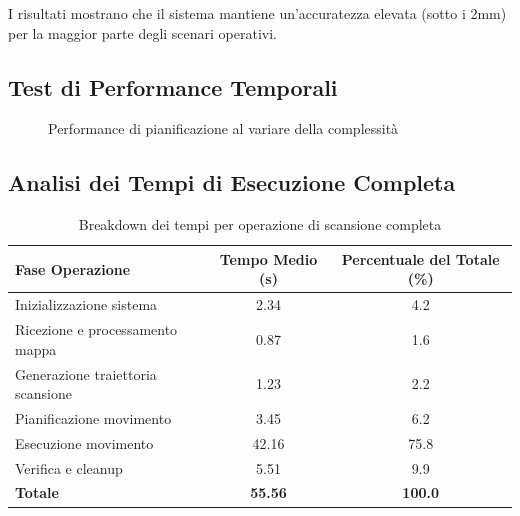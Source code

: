 \documentclass[12pt,a4paper,twoside,openright]{book}
\begin{document}
I risultati mostrano che il sistema mantiene un'accuratezza elevata (sotto i 2mm) per la maggior parte degli scenari operativi.

\subsection{Test di Performance Temporali}

\begin{figure}[H]
\centering
{}
\caption{Performance di pianificazione al variare della complessità}
\label{fig:planning_performance}
\end{figure}

\subsection{Analisi dei Tempi di Esecuzione Completa}

\begin{table}[H]
\centering
\caption{Breakdown dei tempi per operazione di scansione completa}
\label{tab:execution_breakdown}
\begin{tabular}{@{}lcc@{}}
\toprule
\textbf{Fase Operazione} & \textbf{Tempo Medio (s)} & \textbf{Percentuale del Totale (\%)} \\
\midrule
Inizializzazione sistema & 2.34 & 4.2 \\
Ricezione e processamento mappa & 0.87 & 1.6 \\
Generazione traiettoria scansione & 1.23 & 2.2 \\
Pianificazione movimento & 3.45 & 6.2 \\
Esecuzione movimento & 42.16 & 75.8 \\
Verifica e cleanup & 5.51 & 9.9 \\
\midrule
\textbf{Totale} & \textbf{55.56} & \textbf{100.0} \\
\bottomrule
\end{tabular}
\end{table}
\end{document}
